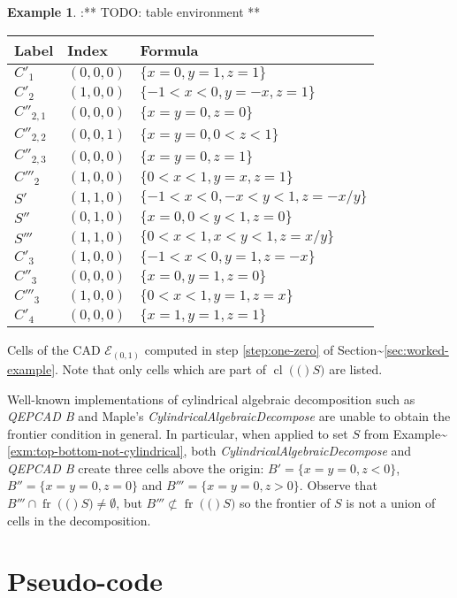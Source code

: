 \documentclass[
]{book}
\theoremstyle{definition}
\theoremstyle{definition}
\newtheorem{example}{Example}[chapter]
\theoremstyle{definition}
\theoremstyle{definition}
\theoremstyle{remark}
\begin{document}
\begin{example}
\protect\hypertarget{exm:cells-of-e-refined}{}\label{exm:cells-of-e-refined}:** TODO: table environment **

\begin{longtable}[]{@{}lll@{}}
\toprule
Label & Index & Formula\tabularnewline
\midrule
\endhead
\({C'_1}\) & \((0,0,0)\) & \(\{ x = 0, y = 1, z = 1 \}\)\tabularnewline
\({C'_2}\) & \((1,0,0)\) & \(\{ -1 < x < 0, y = -x, z = 1 \}\)\tabularnewline
\({C''_{2,1}}\) & \((0,0,0)\) & \(\{ x = y = 0, z = 0 \}\)\tabularnewline
\({C''_{2,2}}\) & \((0,0,1)\) & \(\{ x = y = 0, 0 < z < 1 \}\)\tabularnewline
\({C''_{2,3}}\) & \((0,0,0)\) & \(\{ x = y = 0, z = 1 \}\)\tabularnewline
\({C'''_2}\) & \((1,0,0)\) & \(\{ 0 < x < 1, y = x, z = 1 \}\)\tabularnewline
\(S'\) & \((1,1,0)\) & \(\{ -1 < x < 0, -x < y < 1, z = -x/y \}\)\tabularnewline
\(S''\) & \((0,1,0)\) & \(\{ x = 0, 0 < y < 1, z = 0 \}\)\tabularnewline
\(S'''\) & \((1,1,0)\) & \(\{ 0 < x < 1, x < y < 1, z = x/y \}\)\tabularnewline
\(C'_3\) & \((1,0,0)\) & \(\{ -1 < x < 0, y = 1, z = -x \}\)\tabularnewline
\(C''_3\) & \((0,0,0)\) & \(\{ x = 0, y = 1, z = 0\}\)\tabularnewline
\(C'''_3\) & \((1,0,0)\) & \(\{ 0 < x < 1, y = 1, z = x \}\)\tabularnewline
\({C'_4}\) & \((0,0,0)\) & \(\{ x = 1, y = 1, z = 1 \}\)\tabularnewline
\bottomrule
\end{longtable}

Cells of the CAD \(\mathcal{E}_{(0,1)}\) computed in step \ref{step:one-zero} of Section\textasciitilde{}\ref{sec:worked-example}. Note that only cells which are part of \({\operatorname{cl} \left( ( \right)}S)\) are listed.
\end{example}

Well-known implementations of cylindrical algebraic decomposition such as \emph{QEPCAD B} \citep{brownQepcad} and Maple's \emph{CylindricalAlgebraicDecompose} \citep{chen2014} are unable to obtain the frontier condition in general. In particular, when applied to set \(S\) from Example\textasciitilde{}\ref{exm:top-bottom-not-cylindrical}, both \emph{CylindricalAlgebraicDecompose} and \emph{QEPCAD B} create three cells above the origin: \(B' = \{ x = y = 0, z < 0\}\), \(B'' = \{ x = y = 0, z = 0\}\) and \(B''' = \{ x = y = 0, z > 0\}\). Observe that \(B''' \cap {\operatorname{fr} \left( ( \right)}S) \ne \emptyset\), but \(B''' \not \subset {\operatorname{fr} \left( ( \right)}S)\) so the frontier of \(S\) is not a union of cells in the decomposition.

\hypertarget{pseudo-code}{%
\section{Pseudo-code}\label{pseudo-code}}
\end{document}
